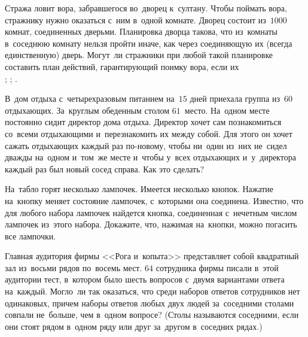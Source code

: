 \begin{problems}
\item
Стража ловит вора, забравшегося во~дворец к~султану.
Чтобы поймать вора, стражнику нужно оказаться с~ним в~одной комнате.
Дворец состоит из~$1000$ комнат, соединенных дверьми.
Планировка дворца такова, что из~комнаты в~соседнюю комнату нельзя пройти
иначе, как через соединяющую их (всегда единственную) дверь.
Могут~ли стражники при любой такой планировке составить план действий,
гарантирующий поимку вора, если их
\\
;
\qquad
{};
\qquad
{}.

\item
В~дом отдыха с~четырехразовым питанием на~$15$ дней приехала группа из~$60$
отдыхающих.
За~круглым обеденным столом $61$~место.
На~одном месте постоянно сидит директор дома отдыха.
Директор хочет сам познакомиться со~всеми отдыхающими и~перезнакомить их между
собой.
Для этого он хочет сажать отдыхающих каждый раз по-новому, чтобы ни~один из~них
не~сидел дважды на~одном и~том~же месте и~чтобы у~всех отдыхающих и~у~директора
каждый раз был новый сосед справа.
Как это сделать?

\item
На~табло горят несколько лампочек.
Имеется несколько кнопок.
Нажатие на~кнопку меняет состояние лампочек, с~которыми она соединена.
Известно, что для любого набора лампочек найдется кнопка, соединенная
с~нечетным числом лампочек из~этого набора.
Докажите, что, нажимая на~кнопки, можно погасить все лампочки.

\item
Главная аудитория фирмы <<Рога и~копыта>> представляет собой квадратный зал
из~восьми рядов по~восемь мест.
$64$ сотрудника фирмы писали в~этой аудитории тест, в~котором было шесть
вопросов с~двумя вариантами ответа на~каждый.
Могло~ли так оказаться, что среди наборов ответов сотрудников нет одинаковых,
причем наборы ответов любых двух людей за~соседними столами совпали не~больше,
чем в~одном вопросе?
(Столы называются соседними, если они стоят рядом в~одном ряду или друг
за~другом в~соседних рядах.)

\end{problems}

